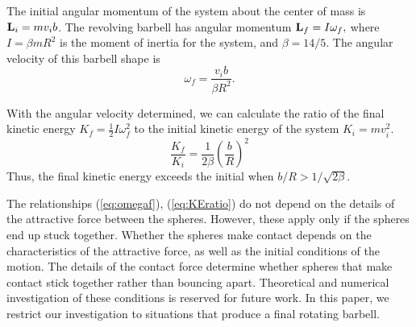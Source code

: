 \documentclass{article}
\begin{document}
The initial angular momentum of the system about the center of mass is $\vb{L}_i=m v_i b$.  The revolving barbell has angular momentum $\vb{L}_f = I \omega_f,$ where $I=\beta m R^2$ is the moment of inertia for the system, and $\beta=14/5$. 
 The angular velocity of this barbell shape is \cite{Lindn2018}
\begin{equation}
    \omega_f = \frac{ v_i b}{\beta  R^2}. \label{eq:omegaf}
\end{equation}


With the angular velocity determined, we can calculate the ratio of the final kinetic energy $K_f=\frac{1}{2} I \omega_f^2$ to the initial kinetic energy of the system $K_i=m v_i^2$. 
\begin{equation}
    \frac{K_f}{K_i} = \frac{1}{2\beta}\left( \frac{b}{R} \right) ^2 \label{eq:KEratio}
\end{equation}
Thus, the final kinetic energy exceeds the initial when $b/R>1/\sqrt{2\beta}$. 

The relationships (\ref{eq:omegaf}), (\ref{eq:KEratio}) do not depend on the details of the attractive force between the spheres. However, these apply only if the spheres end up stuck together. 
Whether the spheres make contact depends on the characteristics of the attractive force, as well as the initial conditions of the motion. 
The details of the contact force determine whether spheres that make contact stick together rather than bouncing apart. 
Theoretical and numerical investigation of these conditions is reserved for future work.
In this paper, we restrict our investigation to situations that produce a final rotating barbell.


\end{document}
